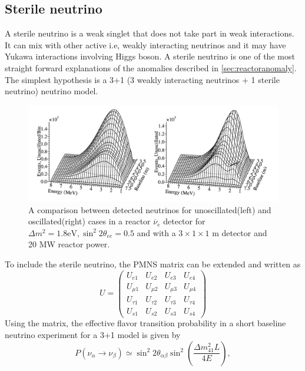 \documentclass[11pt]{article}
\newcommand{\nuebar}{\ensuremath{\overline{\nu }_{e}} \hspace{1pt}}
\numberwithin{equation}{section}
\begin{document}
\subsection[Sterile neutrino]{Sterile neutrino}
A sterile neutrino is a weak singlet that does not take part in weak interactions. It can mix with other active i.e, weakly interacting neutrinos and it may have Yukawa interactions involving Higgs boson. A sterile neutrino is one of the most straight forward explanations of the anomalies described in \ref{sec:reactoranomaly}. The simplest hypothesis is a 3+1 (3 weakly interacting neutrinos + 1 sterile neutrino) neutrino model.
 \begin{figure}[h]
\centering
\includegraphics[width=\textwidth]{./SterileOscillation.PNG}
\caption[Sterile neutrino oscillations]{A comparison between detected neutrinos for unoscillated(left) and oscillated(right) cases in a reactor \nuebar detector for $\Delta m^{2} = 1.8 \text{eV}, \sin^{2}2\theta_{ee}=0.5$  and with a $3 \times 1 \times 1$ m detector and 20 MW reactor power.}
\label{fig:sterileOscillation}
\end{figure}
To include the sterile neutrino, the PMNS matrix can be extended and written as
 \begin{equation}
U = \begin{pmatrix}
U_{e1} & U_{e2} & U_{e3} & U_{e4} \\
U_{\mu 1} & U_{\mu 2} & U_{\mu3}  & U_{\mu 4}\\
U_{\tau 1} & U_{\tau 2} & U_{\tau 3}  & U_{\tau4} \\
 U_{s 1} & U_{s 2} & U_{s 3}  & U_{s4}
     \end{pmatrix}
\end{equation}
Using the matrix, the effective flavor transition probability in a short baseline neutrino experiment for a 3+1 model is given by 
\begin{equation}
P(\nu_{\alpha} \rightarrow \nu_{\beta}) \simeq \sin^{2} 2 \theta _{\alpha \beta} \sin^{2}(\frac{\Delta m^{2}_{41} L }{4 E}),
\end{equation}
\end{document}
